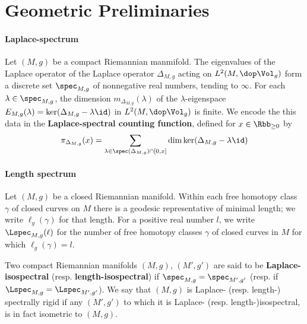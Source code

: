 \section{Geometric Preliminaries}
\paragraph{Laplace-spectrum}
Let $(M,g)$ be a compact Riemannian manmifold. The eigenvalues of the Laplace operator of the Laplace operator $\Delta_{M,g}$ acting on $L^2(M,\dop \Vol_g)$ form a discrete set $\spec_{M,g}$ of nonnegative real numbers, tending to $\infty$. For each $\lambda \in \spec_{M,g}$, the dimension $m_{\Delta_{M,g}}(\lambda)$ of the $\lambda$-eigenspace $E_{M,g}(\lambda)=\ker (\Delta_{M,g}- \lambda \id)$ in $L^2(M, \dop \Vol_g)$ is finite. We encode the this data in the \textbf{Laplace-spectral counting function}, defined for $x\in \Rbb_{\geq 0}$ by
\begin{align}
    \pi_{\Delta_{M,g}}(x) = \sum_{\lambda \in \spec(\Delta_{M,g}) \cap [0,x]} \dim \ker (\Delta_{M,g} - \lambda \id )
\end{align}



\paragraph{Length spectrum}
Let $(M,g)$ be a closed Riemannian manifold.  Within each free homotopy class $\gamma$ of closed curves on $M$ there is a geodesic representative of minimal length; we write $\ell_g(\gamma)$ for that length. For a positive real number $l$, we write $\Lspec_{M,g}(\ell)$ for the number of free homotopy classes $\gamma$ of closed curves in $M$ for which $\ell_g(\gamma) = l$.


Two compact Riemannian manifolds $(M,g)$, $(M',g')$  are said to be \textbf{Laplace-isospectral} (resp. \textbf{length-isospectral})  if $\spec_{M,g} = \spec_{M',g'}$ (resp.  if $\Lspec_{M,g}=\Lspec_{M',g'}$). We say that $(M,g)$ is Laplace- (resp. length-) spectrally rigid if any $(M',g')$ to which it is Laplace- (resp. length-)isospectral, is in fact isometric to $(M,g)$.



